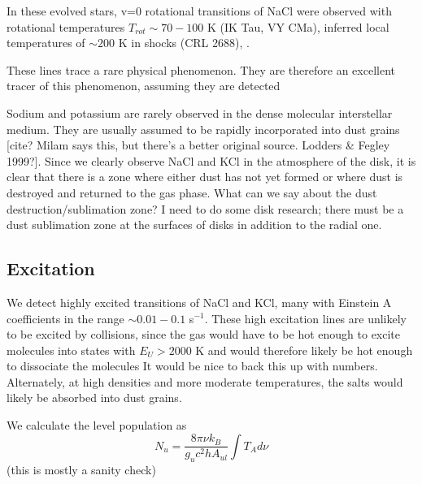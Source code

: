 \documentclass[twocolumn]{aastex62}
\begin{document}
In these evolved stars, v=0 rotational transitions of NaCl were observed
with rotational temperatures $T_{rot}\sim70-100$ K (IK Tau, VY CMa), inferred
local temperatures of $\sim200$ K in shocks (CRL 2688), .

These lines trace a rare physical phenomenon.  They are therefore an excellent tracer
of this phenomenon, assuming they are detected

Sodium and potassium are rarely observed in the dense molecular interstellar medium.
They are usually assumed to be rapidly incorporated into dust grains [cite?  Milam
says this, but there's a better original source.  Lodders \& Fegley 1999?].  Since we clearly observe NaCl
and KCl in the atmosphere of the disk, it is clear that there is a zone where either
dust has not yet formed or where dust is destroyed and returned to the gas phase.
{\color{red} What can we say about the dust destruction/sublimation zone?  I need
to do some disk research; there must be a dust sublimation zone at the surfaces
of disks in addition to the radial one.}

\subsection{Excitation}
We detect highly excited transitions of NaCl and KCl, many with Einstein A coefficients
in the range $\sim0.01-0.1$ s$^{-1}$.  These high excitation lines are unlikely
to be excited by collisions, since the gas would have to be hot enough to excite
molecules into states with $E_U > 2000$ K and would therefore likely be hot enough
to dissociate the molecules {\color{red} It would be nice to back this up with numbers}.  Alternately,
at high densities and more moderate temperatures, the salts would likely be absorbed
into dust grains.

We calculate the level population as
\begin{equation}
    N_u = \frac{8 \pi \nu k_B}{g_u c^2 h A_{ul}} \int T_A d\nu
\end{equation}
{\color{red} (this is mostly a sanity check)}
\end{document}
